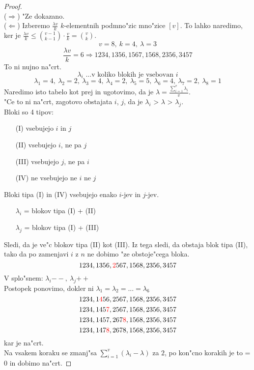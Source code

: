 \documentclass[a4paper,12pt]{article}
\theoremstyle{definition}
\theoremstyle{remark}
\begin{document}
\begin{proof}\mbox{}\\
	($\Rightarrow$) "Ze dokazano.\\
	($\Leftarrow$) Izberemo $\frac{\lambda v}{k}$ $k$-elementnih podmno"zic mno"zice $[v]$. To lahko naredimo, ker je $\frac{\lambda v}{k} \leqslant \binom{v - 1}{k - 1}\cdot \frac{v}{k} = \binom{v}{k}$.\\
	
	\[v = 8, \ k = 4, \ \lambda = 3\]
	\[\frac{\lambda v}{k} = 6  \Rightarrow 1234, 1356, 1567, 1568, 2356, 3457\]
	To ni nujno na"crt.
	\[\lambda_i \text{ \ldots v koliko blokih je vsebovan }i\]
	\[\lambda_1 = 4,\ \lambda_2 = 2,\ \lambda_3 = 4,\ \lambda_4 = 2,\ \lambda_5 = 5,\ \lambda_6 = 4,\ \lambda_7 = 2,\ \lambda_8 = 1\]
	Naredimo isto tabelo kot prej in ugotovimo, da je $\lambda = \frac{\sum_{i = 1}^v \lambda_i}{v}$.\\
	"Ce to ni na"crt, zagotovo obstajata $i$, $j$, da je $\lambda_i$ > $\lambda$ > $\lambda_j$.\\
	
	Bloki so 4 tipov:
	\begin{itemize}
	    \item[(I)] vsebujejo $i$ in $j$
	    \item[(II)] vsebujejo $i$, ne pa $j$
	    \item[(III)] vsebujejo $j$, ne pa $i$
	    \item[(IV)] ne vsebujejo ne $i$ ne $j$\\
	\end{itemize}
	
	Bloki tipa (I) in (IV) vsebujejo enako $i$-jev in $j$-jev.
	\begin{itemize}
	    \item[] $\lambda_i$ = blokov tipa (I) + (II)
	    \item[] $\lambda_j$ = blokov tipa (I) + (III)
	\end{itemize}
	Sledi, da je ve"c blokov tipa (II) kot (III). Iz tega sledi, da obstaja blok tipa (II), tako da po zamenjavi $i$ z $n$ ne dobimo "ze obstoje"cega bloka.\\
	\[ 1234, 1356, \textcolor{red}{2}567, 1568, 2356, 3457 \]
	V splo"snem: $\lambda_i\!\mathrel{--},\ \lambda_j\!\mathrel{++}$\\
	Postopek ponovimo, dokler ni $\lambda_1 = \lambda_2 = ... = \lambda_6$
	\[1234, 1\textcolor{red}{4}56, 2567, 1568, 2356, 3457\]
	\[1234, 145\textcolor{red}{7}, 2567, 1568, 2356, 3457\]
	\[1234, 1457, 267\textcolor{red}{8}, 1568, 2356, 3457\]
	\[1234, 147\textcolor{red}{8}, 2678, 1568, 2356, 3457\]
	kar je na"crt.\\
	Na vsakem koraku se zmanj"sa $\displaystyle \sum_{i = 1}^v (\lambda_i - \lambda)$ za $2$, po kon"cno korakih je to = $0$ in dobimo na"crt.
\end{proof}
\end{document}
